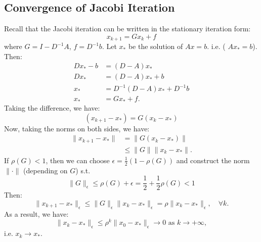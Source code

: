 \documentclass[../main/main.tex]{subfiles}
\begin{document}
\subsection{Convergence of Jacobi Iteration}
Recall that the Jacobi iteration can be written in the stationary iteration form: \[
x_{k+1} = G x_{k} + f
\] where $G = I-D^{-1}A$, $f = D^{-1} b$. Let $x_{*}$ be the solution of $Ax=b$. i.e. ( $Ax_{*} = b$). Then:
\begin{align*}
  Dx_{*}-b &= (D-A)x_{*}\\
  Dx_{*} &= (D-A)x_{*}+b \\
  x_{*}&= D^{-1}(D-A)x_{*} + D^{-1} b \\
  x_{*}&= Gx_{*} + f
  .\end{align*}
Taking the difference, we have: \[
(x_{k+1}-x_{*}) = G(x_{k}-x_{*})
\] Now, taking the norms on both sides, we have: \begin{align*}
                                                   \|x_{k+1} - x_{*}\| &= \|G(x_{k}-x_{*})\| \\
&\leq \|G\|\|x_{k}-x_{*}\|
                                                   .\end{align*}
                                                 If $\rho(G)<1$, then we can choose $\epsilon = \frac{1}{2}(1-\rho(G))$ and construct the norm $\|\cdot\|$ (depending on $G$) s.t.  \[
                                                \|G\|_{\epsilon} \leq \rho(G) + \epsilon = \frac{1}{2} + \frac{1}{2}\rho(G) < 1
                                                 \]
                                                 Then: \[
                                                   \|x_{k+1}- x_{*}\|_{\epsilon}\leq \|G\|_{\epsilon}\|x_{k}-x_{*}\|_{\epsilon} = \rho \|x_{k}- x_{*}\|_{\epsilon}, \quad \forall k.
                                                 \] As a result, we have: \[
\|x_{k}-x_{*}\|_{\epsilon}\leq \rho^{k}\|x_{0}-x_{*}\|_{\epsilon}\to 0 \text{ as }k\to +\infty
,\] i.e. $x_{k}\to x_{*}$.
\end{document}
